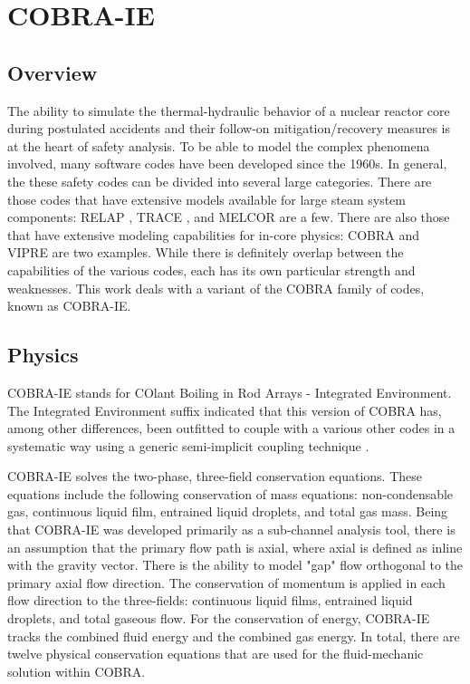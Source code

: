 \chapter{COBRA-IE}
\label{chap:cobra}

\section{Overview}
\label{sect:cobra_overview}
The ability to simulate the thermal-hydraulic behavior of a nuclear reactor core during postulated accidents and their follow-on mitigation/recovery measures is at the heart of safety analysis.
To be able to model the complex phenomena involved, many software codes have been developed since the 1960s.
In general, the these safety codes can be divided into several large categories. There are those codes that have extensive models available for large steam system components: RELAP \cite{RELAP}, TRACE \cite{TRACE}, and MELCOR are a few.
There are also those that have extensive modeling capabilities for in-core physics: COBRA \cite{Thurgood1983c} and VIPRE are two examples.
While there is definitely overlap between the capabilities of the various codes, each has its own particular strength and weaknesses.
This work deals with a variant of the COBRA family of codes, known as COBRA-IE.

\section{Physics}
\label{sect:cobra_physics}
COBRA-IE stands for COlant Boiling in Rod Arrays - Integrated Environment.
The Integrated Environment suffix indicated that this version of COBRA has, among other differences, been outfitted to couple with a various other codes in a systematic way using a generic semi-implicit coupling technique \cite{Weaver2002}.

COBRA-IE solves the two-phase, three-field conservation equations.
These equations include the following conservation of mass equations: non-condensable gas, continuous liquid film, entrained liquid droplets, and total gas mass.
Being that COBRA-IE was developed primarily as a sub-channel analysis tool, there is an assumption that the primary flow path is axial, where axial is defined as inline with the gravity vector.
There is the ability to model "gap" flow orthogonal to the primary axial flow direction.
The conservation of momentum is applied in each flow direction to the three-fields: continuous liquid films, entrained liquid droplets, and total gaseous flow.
For the conservation of energy, COBRA-IE tracks the combined fluid energy and the combined gas energy.
In total, there are twelve physical conservation equations that are used for the fluid-mechanic solution within COBRA.


